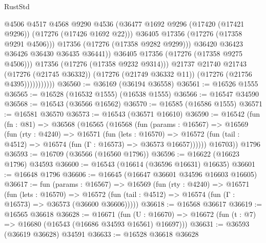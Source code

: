 \begin{lexlean}{RustStd}
\begin{coremodule}
                                  @4506
                                  @4517
                                  @4568
                                  @9290
                                  @4536
                                  (@36477
                                    @1692
                                    @9296
                                    (@17420 (@17421 @9296))
                                    (@17276 (@17426 @1692 @22)))
                                  @36405
                                  @17356
                                  (@17276 (@17358 @9291 @4506)))
                                @17356
                                (@17276 (@17358 @9282 @9299)))
                              @36420
                              @36423
                              @36426
                              @36430
                              @36435
                              @36441))
                          @36405
                          @17356
                          (@17276 (@17358 @9275 @4506)))
                        @17356
                        (@17276 (@17358 @9232 @9314)))
                      @21737
                      @21740
                      @21743
                      (@17276 (@21745 @36332))
                      (@17276 (@21749 @36332 @11))
                      (@17276 (@21756 @4395)))))))))))
@36560 := @36169 (@36194 @36558)
@36561 := @16526 @1555
@36565 := @16528 (@16532 @1555) (@16538 @1555)
@36566 := @16547 @34590
@36568 := @16543 (@36566 @16562)
@36570 := @16585 (@16586 @1555)
@36571 := @16581 @36570
@36573 := @16543 (@36571 @16610)
@36590 := @16542
    (fun (fn : @81) =>
    @36568
      (@16565
        (@16568
          (fun (params : @16567) =>
          @16569
            (fun (rty : @4240) =>
            @16571
              (fun (lets : @16570) =>
              @16572 (fun (tail : @4512) => @16574 (fun (Γ : @16573) => @36573 @16657))))))
        @16703))
    @1796
@36593 := @16709 (@36566 (@16560 @1796))
@36596 := @16622 (@16623 @1796) @34593
@36600 := @16543 (@16614 (@36596 @16631) @16635)
@36601 := @16648 @1796
@36606 := @16645 (@16647 @36601 @34596 @16603 @16605)
@36617 := fun (params : @16567) =>
  @16569
    (fun (rty : @4240) =>
    @16571
      (fun (lets : @16570) =>
      @16572 (fun (tail : @4512) => @16574 (fun (Γ : @16573) => @36573 (@36600 @36606)))))
@36618 := @16568 @36617
@36619 := @16565 @36618
@36628 := @16671
    (fun (U : @16670) => @16672 (fun (t : @7) => @16680 (@16543 (@16686 @34593 @16561) @16697)))
@36631 := @36593 (@36619 @36628) @34591
@36633 := @16528 @36618 @36628

\end{coremodule}
\end{lexlean}
